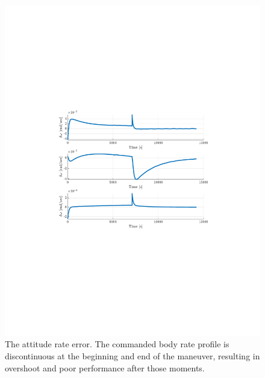 \documentclass[]{article}
\begin{document}
\begin{figure}[!h]
	\centering
	\includegraphics[width=\linewidth,trim={4cm, 8cm, 4cm, 8cm},clip]{figs/P2Q2.pdf}
	\caption{The attitude rate error. The commanded body rate profile is discontinuous at the beginning and end of the maneuver, resulting in overshoot and poor performance after those moments.}
	\label{fig:P2Q2}
\end{figure}
\end{document}
